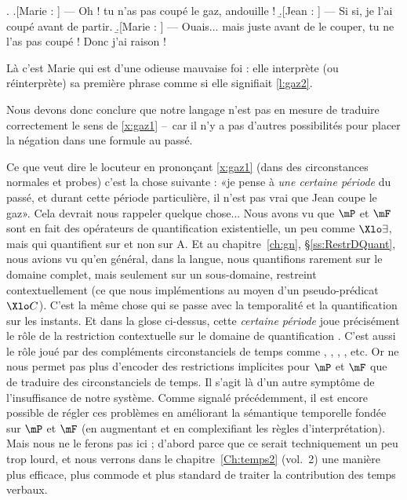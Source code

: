 \ex. 
\a.[Marie : ] --- Oh ! tu n'as pas coupé le gaz, andouille !
\b.[Jean : ] --- Si si, je l'ai coupé  avant de partir.
\b.[Marie : ] --- Ouais... mais juste avant de le couper, tu ne l'as pas coupé ! Donc j'ai raison !

Là c'est Marie qui est d'une odieuse mauvaise foi : elle interprète (ou réinterprète) sa première phrase comme si elle signifiait \ref{l:gaz2}.

Nous devons donc conclure que notre langage {\LO} n'est pas en mesure de traduire correctement le sens de \ref{x:gaz1} --~car il n'y a pas d'autres possibilités pour placer la négation dans une formule au passé.



Ce que veut dire le locuteur en prononçant \ref{x:gaz1} (dans des
circonstances normales et probes) c'est la chose suivante : 
«je pense à \emph{une certaine période} du passé, et
durant cette période particulière, il n'est pas vrai que Jean coupe le gaz».  
Cela devrait nous rappeler quelque chose... Nous avons vu que $\mP$ et $\mF$ sont en fait des opérateurs de quantification existentielle, un peu comme $\Xlo\exists$, mais qui quantifient sur {\Tps} et non sur {\Unv A}. Et au chapitre~\ref{ch:gn}, \S\ref{ss:RestrDQuant}, nous avions vu qu'en général, dans la langue, nous quantifions rarement sur le domaine complet, mais seulement sur un sous-domaine, restreint contextuellement (ce que nous implémentions au moyen d'un pseudo-prédicat $\Xlo C$).  C'est la même chose qui se passe avec la temporalité et la quantification sur les instants. Et dans la glose ci-dessus, cette \emph{certaine période} joue précisément le rôle de la restriction contextuelle sur le domaine de quantification \Tps. 
C'est aussi le rôle joué par des compléments circonstanciels de temps comme , , , , etc.  Or  {\LO} ne nous permet pas plus d'encoder des restrictions implicites pour $\mP$ et $\mF$ que de traduire des circonstanciels de temps.
Il s'agit là d'un autre symptôme de l'insuffisance de notre système.
Comme signalé précédemment, il est encore possible de régler ces problèmes en améliorant  la sémantique temporelle fondée sur $\mP$ et $\mF$ (en augmentant {\LO} et en complexifiant les règles d'interprétation).
Mais nous ne le ferons pas ici ; 
d'abord parce que ce serait techniquement un peu trop lourd, et nous verrons
dans le chapitre~\ref{Ch:temps2} (vol.~2) une manière plus efficace, plus commode  et plus standard de traiter la contribution des temps verbaux. 

